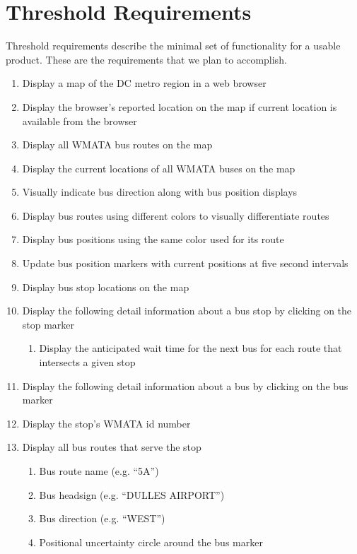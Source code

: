 \documentclass[12pt]{report}
\begin{document}
\section{Threshold Requirements}
Threshold requirements describe the minimal set of functionality for a usable product.  These are the requirements that we plan to accomplish.
\begin{enumerate}
\item Display a map of the DC metro region in a web browser
\item Display the browser's reported location on the map if current location is available from the browser
\item Display all WMATA bus routes on the map
\item Display the current locations of all WMATA buses on the map
\item Visually indicate bus direction along with bus position displays
\item Display bus routes using different colors to visually differentiate routes
\item Display bus positions using the same color used for its route
\item Update bus position markers with current positions at five second intervals
\item Display bus stop locations on the map
\item Display the following detail information about a bus stop by clicking on the stop marker
\begin{enumerate}
\item Display the anticipated wait time for the next bus for each route that intersects a given stop
\end{enumerate}
\item Display the following detail information about a bus by clicking on the bus marker
\item Display the stop's WMATA id number
\item Display all bus routes that serve the stop
\begin{enumerate}
\item Bus route name (e.g. ``5A'')
\item Bus headsign (e.g. ``DULLES AIRPORT'')
\item Bus direction (e.g. ``WEST'')
\item Positional uncertainty circle around the bus marker
\end{enumerate}
\end{enumerate}
\end{document}
